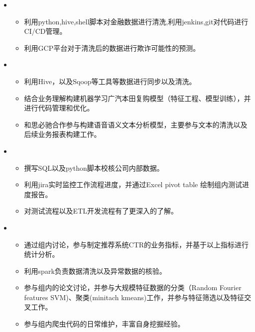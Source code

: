 
  \begin{itemize}[leftmargin=*]
         \item
           {\small
      \begin{itemize}
      \item 利用python,hive,shell脚本对金融数据进行清洗,利用jenkins,git对代码进行CI/CD管理。
          \item 利用GCP平台对于清洗后的数据进行欺诈可能性的预测。
            \end{itemize}
           }
       \item
           {\small
      \begin{itemize}
      \item 利用Hive，以及Sqoop等工具等数据进行同步以及清洗。
         \item 结合业务理解构建机器学习广汽本田复购模型（特征工程、模型训练），并进行代码管理和优化。
          \item 和思必驰合作参与构建语音语义文本分析模型，主要参与文本的清洗以及后续业务报表构建工作。
            \end{itemize}

             }
  \end{itemize}
  \begin{itemize}[leftmargin=*]
     \item
        {\small
      \begin{itemize}
      \item 撰写SQL以及python脚本校核公司内部数据。
        \item 利用jira实时监控工作流程进度，并通过Excel pivot table 绘制组内测试进度报告。
         \item 对测试流程以及ETL开发流程有了更深入的了解。
         
       \end{itemize}
       }
        \item
           {\small
      \begin{itemize}
      \item 通过组内讨论，参与制定推荐系统CTR的业务指标，并基于以上指标进行统计分析。
         \item 利用spark负责数据清洗以及异常数据的核验。
          \item 参与组内的论文讨论，并参与大规模特征数据的分类（Random Fourier features SVM)、聚类(minitach kmeans)工作，并参与特征筛选以及特征交叉工作。
           \item 参与组内爬虫代码的日常维护，丰富自身挖掘经验。

            \end{itemize}

             }

  \end{itemize}


